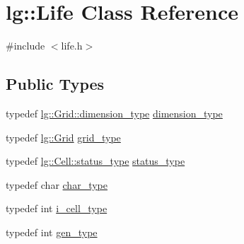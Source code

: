 \hypertarget{classlg_1_1Life}{}\section{lg\+:\+:Life Class Reference}
\label{classlg_1_1Life}


{\ttfamily \#include $<$life.\+h$>$}

\subsection*{Public Types}
\begin{DoxyCompactItemize}
\item 
typedef \hyperlink{classlg_1_1Grid_a11f5474e622f3053e006acf549c41f10}{lg\+::\+Grid\+::dimension\+\_\+type} \hyperlink{classlg_1_1Life_a05357ceab438f920c6f3dbdde93f28be}{dimension\+\_\+type}
\item 
typedef \hyperlink{classlg_1_1Grid}{lg\+::\+Grid} \hyperlink{classlg_1_1Life_ac1ca0328d97e90476808cb39eb0a9959}{grid\+\_\+type}
\item 
typedef \hyperlink{classlg_1_1Cell_a10376a213d664b96708f0d1e6d512f20}{lg\+::\+Cell\+::status\+\_\+type} \hyperlink{classlg_1_1Life_ade9bb352ec981ff88c2ec37a0a12006c}{status\+\_\+type}
\item 
typedef char \hyperlink{classlg_1_1Life_a9d2980d7a77c0b01c639a013765869db}{char\+\_\+type}
\item 
typedef int \hyperlink{classlg_1_1Life_a35201ae72bdab2eb51e6d9782b48a920}{i\+\_\+cell\+\_\+type}
\item 
typedef int \hyperlink{classlg_1_1Life_a31abf1588df7f6f299cadce0ab6da9f9}{gen\+\_\+type}
\end{DoxyCompactItemize}
